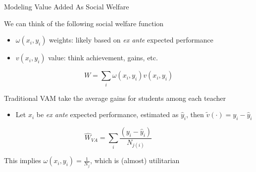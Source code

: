 \documentclass[11pt]{beamer}
\newenvironment{wideitemize}{\itemize\addtolength{\itemsep}{14pt}}{\enditemize}
\begin{document}
\begin{frame}{Modeling Value Added As Social Welfare}

\begin{wideitemize}
    \item We can think of the following social welfare function
    \begin{itemize}
        \item $\omega(x_i,y_i)$ weights: likely based on \textit{ex ante} expected performance
        \item $v(x_i,y_i)$ value: think achievement, gains, etc.
    \end{itemize}
    \[
    W  = \sum_i \omega(x_i,y_i) v(x_i,y_i) 
    \] 
    
    \item Traditional VAM take the average gains for students among each teacher
    \begin{itemize}
        \item Let $x_i$ be \textit{ex ante} expected performance, estimated as $\hat{y}_i$, then $\tilde{v}(\cdot) = y_i - \hat{y}_i$
    \end{itemize}
    \[
    \hat{W}_{VA}  = \sum_i \frac{(y_i-\hat{y}_i)}{N_{j(i)}} \hspace{3em}
    \]
    
    \item This implies $\omega(x_i,y_i)=\frac{1}{N_j}$, which is (almost) utilitarian

\end{wideitemize}


\end{frame}


\end{document}
